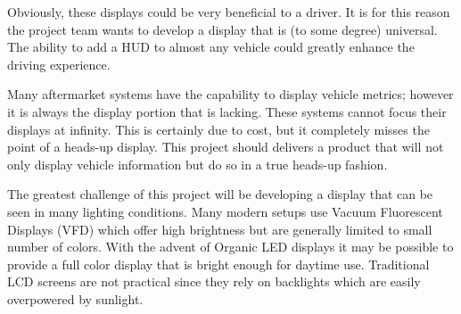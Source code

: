 Obviously, these displays could be very beneficial to a driver. It is for
this reason the project team wants to develop a display that is (to some
degree) universal. The ability to add a HUD to almost any vehicle could
greatly enhance the driving experience.

Many aftermarket systems have the capability to display vehicle
metrics; however it is always the display portion that is lacking. These
systems cannot focus their displays at infinity. This is certainly due to
cost, but it completely misses the point of a heads-up display. This
project should delivers a product that will not only display
vehicle information but do so in a true heads-up fashion.

The greatest challenge of this project will be developing a display that
can be seen in many lighting conditions. Many modern setups use Vacuum
Fluorescent Displays (VFD) which offer high brightness but are generally
limited to small number of colors. With the advent of Organic LED displays
it may be possible to provide a full color display that is bright enough
for daytime use. Traditional LCD screens are not practical since they rely
on backlights which are easily overpowered by sunlight.
